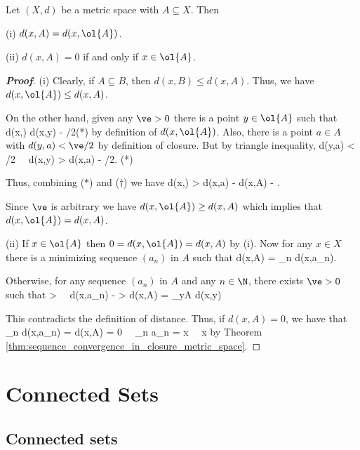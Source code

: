 \begin{proposition}
Let $(X,d)$ be a metric space with $A\subseteq X$. Then
\ben
\item [(i)] $d(x,A) = d(x,\ol{A})$.
\item [(ii)] $d(x,A) = 0$ if and only if $x\in \ol{A}$.
\een
\end{proposition}

\begin{proof}[\bf Proof]
\ben
\item [(i)] Clearly, if $A\subseteq B$, then $d(x,B) \leq d(x,A)$. Thus, we have $d(x,\ol{A}) \leq d(x,A)$.

On the other hand, given any $\ve>0$ there is a point $y\in \ol{A}$ such that
\be
d(x,) \geq d(x,y) - \ve/2\qquad (*)
\ee
by definition of $d(x,\ol{A})$. Also, there is a point $a\in A$ with $d(y,a) < \ve/2$ by definition of closure. But by triangle inequality,
\be
{} \leq d(y,a) < \ve/2 \ \ra\ d(x,y) > d(x,a) - \ve/2. \qquad (*)
\ee

Thus, combining ($*$) and ($\dag$) we have
\be
d(x,) > d(x,a) - \ve \geq d(x,A) - \ve.
\ee

Since $\ve$ is arbitrary we have $d(x,\ol{A}) \geq d(x,A)$ which implies that $d(x,\ol{A}) = d(x,A)$.

\item [(ii)] If $x\in \ol{A}$ then $0 = d(x,\ol{A}) = d(x,A)$ by (i). Now for any $x\in X$ there is a minimizing sequence $(a_n)$ in $A$ such that
\be
d(x,A) = \lim_{n\to \infty} d(x,a_n).
\ee

Otherwise, for any sequence $(a_n)$ in $A$ and any $n\in \N$, there exists $\ve>0$ such that
\be
{} > \ve \ \ra\ d(x,a_n) - \ve > d(x,A) = \inf_{y\in A} d(x,y)
\ee

This contradicts the definition of distance. Thus, if $d(x,A) = 0$, we have that
\be
\lim_{n\to \infty} d(x,a_n) = d(x,A) = 0 \ \ra\ \lim_{n\to \infty} a_n = x \ \ra\ x\in {}
\ee
by Theorem \ref{thm:sequence_convergence_in_closure_metric_space}.
\een
\end{proof}






\section{Connected Sets}

\subsection{Connected sets}

